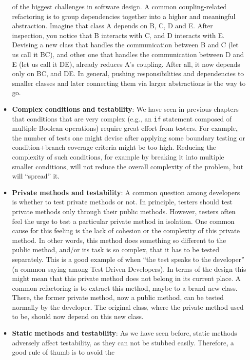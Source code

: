 \begin{itemize}
  of the biggest challenges in software design. A common
  coupling-related refactoring is to group dependencies together into a
  higher and meaningful abstraction. Imagine that class A depends on B,
  C, D and E. After inspection, you notice that B interacts with C, and
  D interacts with E. Devising a new class that handles the
  communication between B and C (let us call it BC), and other one that
  handles the communication between D and E (let us call it DE), already
  reduces A's coupling. After all, it now depends only on BC, and DE. In
  general, pushing responsibilities and dependencies to smaller classes
  and later connecting them via larger abstractions is the way to go.
\item
  \textbf{Complex conditions and testability}: We have seen in previous
  chapters that conditions that are very complex (e.g., an \texttt{if}
  statement composed of multiple Boolean operations) require great
  effort from testers. For example, the number of tests one might devise
  after applying some boundary testing or condition+branch coverage
  criteria might be too high. Reducing the complexity of such
  conditions, for example by breaking it into multiple smaller
  conditions, will not reduce the overall complexity of the problem, but
  will ``spread'' it.
\item
  \textbf{Private methods and testability}: A common question among
  developers is whether to test private methods or not. In principle,
  testers should test private methods only through their public methods.
  However, testers often feel the urge to test a particular private
  method in isolation. One common cause for this feeling is the lack of
  cohesion or the complexity of this private method. In other words,
  this method does something so different to the public method, and/or
  its task is so complex, that it has to be tested separately. This is a
  good example of when ``the test speaks to the developer'' (a common
  saying among Test-Driven Developers). In terms of the design this
  might mean that this private method does not belong in its current
  place. A common refactoring is to extract this method, maybe to a
  brand new class. There, the former private method, now a public
  method, can be tested normally by the developer. The original class,
  where the private method used to be, should now depend on this new
  class.
\item
  \textbf{Static methods and testability}: As we have seen before,
  static methods adversely affect testability, as they can not be
  stubbed easily. Therefore, a good rule of thumb is to avoid the

\end{itemize}
